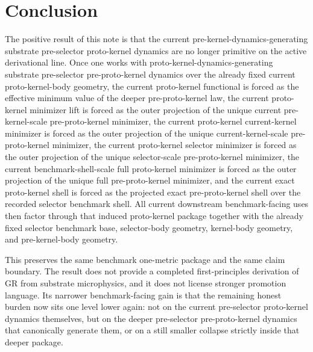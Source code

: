 \documentclass[11pt]{article}
\begin{document}
\section{Conclusion}

The positive result of this note is that the current pre-kernel-dynamics-generating substrate pre-selector proto-kernel dynamics are no longer primitive on the active derivational line. Once one works with proto-kernel-dynamics-generating substrate pre-selector pre-proto-kernel dynamics over the already fixed current proto-kernel-body geometry, the current proto-kernel functional is forced as the effective minimum value of the deeper pre-proto-kernel law, the current proto-kernel minimizer lift is forced as the outer projection of the unique current pre-kernel-scale pre-proto-kernel minimizer, the current proto-kernel current-kernel minimizer is forced as the outer projection of the unique current-kernel-scale pre-proto-kernel minimizer, the current proto-kernel selector minimizer is forced as the outer projection of the unique selector-scale pre-proto-kernel minimizer, the current benchmark-shell-scale full proto-kernel minimizer is forced as the outer projection of the unique full pre-proto-kernel minimizer, and the current exact proto-kernel shell is forced as the projected exact pre-proto-kernel shell over the recorded selector benchmark shell. All current downstream benchmark-facing uses then factor through that induced proto-kernel package together with the already fixed selector benchmark base, selector-body geometry, kernel-body geometry, and pre-kernel-body geometry.

This preserves the same benchmark one-metric package and the same claim boundary. The result does not provide a completed first-principles derivation of GR from substrate microphysics, and it does not license stronger promotion language. Its narrower benchmark-facing gain is that the remaining honest burden now sits one level lower again: not on the current pre-selector proto-kernel dynamics themselves, but on the deeper pre-selector pre-proto-kernel dynamics that canonically generate them, or on a still smaller collapse strictly inside that deeper package.
\end{document}
